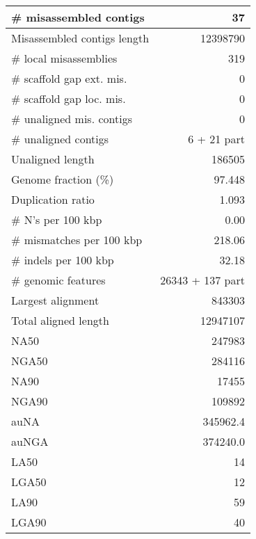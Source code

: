 \documentclass[12pt,a4paper]{article}
\begin{document}
\begin{table}[ht]
\begin{center}
\begin{tabular}{|l*{1}{|r}|}
\# misassembled contigs & 37 \\ \hline
Misassembled contigs length & 12398790 \\ \hline
\# local misassemblies & 319 \\ \hline
\# scaffold gap ext. mis. & 0 \\ \hline
\# scaffold gap loc. mis. & 0 \\ \hline
\# unaligned mis. contigs & 0 \\ \hline
\# unaligned contigs & 6 + 21 part \\ \hline
Unaligned length & 186505 \\ \hline
Genome fraction (\%) & 97.448 \\ \hline
Duplication ratio & 1.093 \\ \hline
\# N's per 100 kbp & 0.00 \\ \hline
\# mismatches per 100 kbp & 218.06 \\ \hline
\# indels per 100 kbp & 32.18 \\ \hline
\# genomic features & 26343 + 137 part \\ \hline
Largest alignment & 843303 \\ \hline
Total aligned length & 12947107 \\ \hline
NA50 & 247983 \\ \hline
NGA50 & 284116 \\ \hline
NA90 & 17455 \\ \hline
NGA90 & 109892 \\ \hline
auNA & 345962.4 \\ \hline
auNGA & 374240.0 \\ \hline
LA50 & 14 \\ \hline
LGA50 & 12 \\ \hline
LA90 & 59 \\ \hline
LGA90 & 40 \\ \hline
\end{tabular}
\end{center}
\end{table}
\end{document}
